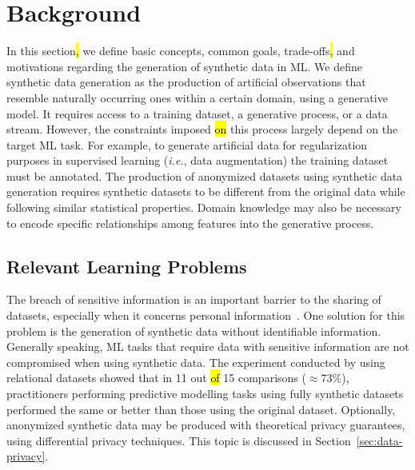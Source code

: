 \section{Background}\label{sec:background}

In this section\hl{,} we define basic\hl{ }concepts, common goals,
trade-offs\hl{,} and
motivations regarding the generation of synthetic data in ML\@. We define
synthetic data generation as the production of artificial observations that
resemble naturally occurring ones within a certain domain, using a generative
model. It requires access to a training dataset, a generative process, or a
data stream. However, the constraints imposed \hl{on} this process largely
depend\hl{ } on the target ML task. For example, to generate artificial data
for regularization purposes in supervised learning (\textit{i.e.}, data
augmentation) the training dataset must be annotated. The production of
anonymized datasets using synthetic data generation requires synthetic
datasets to be different from the original data while following similar
statistical properties. Domain knowledge may also be necessary to encode
specific relationships among features into the generative process.


\subsection{Relevant Learning Problems}

The breach of sensitive information is an important barrier to the sharing of
datasets, especially when it concerns personal
information~\cite{dankar2021fake}. One solution for this problem is the
generation of synthetic data without identifiable information. Generally
speaking, ML tasks that require data with sensitive information are not
compromised when using synthetic data. The experiment conducted by
\cite{patki2016synthetic} using relational datasets showed that in 11 out
\hl{of} 15 comparisons ($\approx 73\%$), practitioners performing predictive
modelling tasks using fully synthetic datasets performed the same or better
than those using the original dataset. Optionally, anonymized synthetic data
may be produced with theoretical privacy guarantees, using differential
privacy techniques. This topic is discussed in Section~\ref{sec:data-privacy}.

